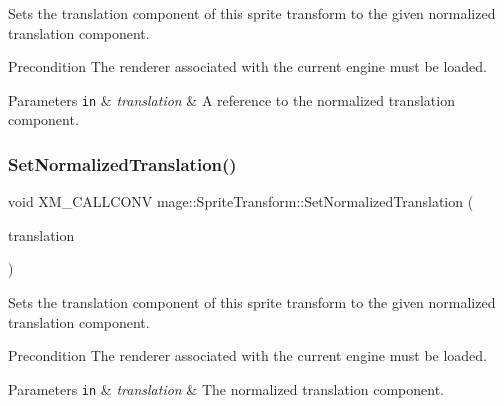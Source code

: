Sets the translation component of this sprite transform to the given normalized translation component.

\begin{DoxyPrecond}{Precondition}
The renderer associated with the current engine must be loaded. 
\end{DoxyPrecond}

\begin{DoxyParams}[1]{Parameters}
\mbox{\tt in}  & {\em translation} & A reference to the normalized translation component. \\
\hline
\end{DoxyParams}
\hypertarget{structmage_1_1_sprite_transform_af72bc622e7512910e5a9ceb8aeeec22d}{}\label{structmage_1_1_sprite_transform_af72bc622e7512910e5a9ceb8aeeec22d} 
\subsubsection{\texorpdfstring{Set\+Normalized\+Translation()}{SetNormalizedTranslation()}\hspace{0.1cm}{\footnotesize\ttfamily [3/3]}}
{\footnotesize\ttfamily void X\+M\+\_\+\+C\+A\+L\+L\+C\+O\+NV mage\+::\+Sprite\+Transform\+::\+Set\+Normalized\+Translation (\begin{DoxyParamCaption}\item[{F\+X\+M\+V\+E\+C\+T\+OR}]{translation }\end{DoxyParamCaption})}

Sets the translation component of this sprite transform to the given normalized translation component.

\begin{DoxyPrecond}{Precondition}
The renderer associated with the current engine must be loaded. 
\end{DoxyPrecond}

\begin{DoxyParams}[1]{Parameters}
\mbox{\tt in}  & {\em translation} & The normalized translation component. \\
\hline
\end{DoxyParams}
\hypertarget{structmage_1_1_sprite_transform_abe257791a06801a7f4aa34f0e83acfea}{}\label{structmage_1_1_sprite_transform_abe257791a06801a7f4aa34f0e83acfea} 
